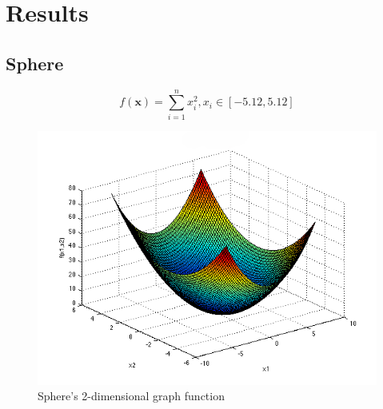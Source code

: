 \documentclass{article}
\begin{document}

\newpage
\section{Results}


\subsection{Sphere}
$$f(\mathbf{x}) = \sum_{i=1}^{n} x_i^2 , x_i \in \left[ -5.12, 5.12 \right] $$


\begin{figure}[!h]
\includegraphics[width=\textwidth,height=\textheight,keepaspectratio]{sphere.png}
  \caption{Sphere's 2-dimensional graph function \cite{sf-uni-sp}}
\end{figure}

 
\end{document}
